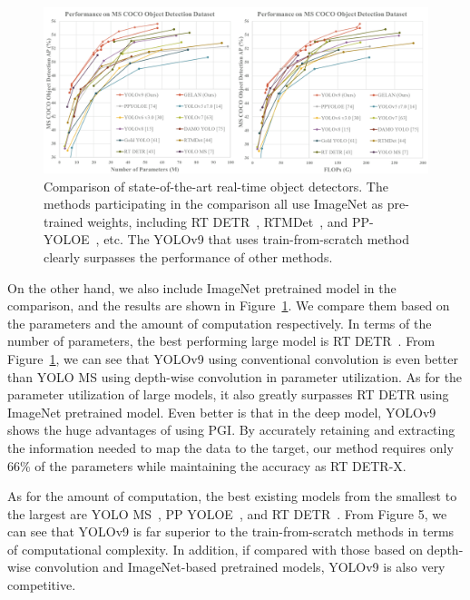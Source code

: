 \documentclass[10pt,twocolumn,letterpaper]{article}
\begin{document}
	\begin{figure}[t]
		\begin{center}
			\includegraphics[width=.85\linewidth]{figs/perf}
		\end{center}
		\vspace{-6pt}
		\caption{Comparison of state-of-the-art real-time object detectors. The methods participating in the comparison all use ImageNet as pre-trained weights, including RT DETR~\cite{lv2023detrs}, RTMDet~\cite{lyu2022rtmdet}, and PP-YOLOE~\cite{xu2022pp}, etc.  The YOLOv9 that uses train-from-scratch method clearly surpasses the performance of other methods.}	
		\vspace{-12pt}
		\label{fig:perf}
	\end{figure}
	
	On the other hand, we also include ImageNet pretrained model in the comparison, and the results are shown in Figure~\ref{fig:perf}.  We compare them based on the parameters and the amount of computation respectively.  In terms of the number of parameters, the best performing large model is RT DETR~\cite{lv2023detrs}.  From Figure~\ref{fig:perf}, we can see that YOLOv9 using conventional convolution is even better than YOLO MS using depth-wise convolution in parameter utilization.  As for the parameter utilization of large models, it also greatly surpasses RT DETR using ImageNet pretrained model.  Even better is that in the deep model, YOLOv9 shows the huge advantages of using PGI.  By accurately retaining and extracting the information needed to map the data to the target, our method requires only 66\% of the parameters while maintaining the accuracy as RT DETR-X.
	
	\newpage
	
	As for the amount of computation, the best existing models from the smallest to the largest are YOLO MS~\cite{chen2023yolo}, PP YOLOE~\cite{xu2022pp}, and RT DETR~\cite{lv2023detrs}.  From Figure 5, we can see that YOLOv9 is far superior to the train-from-scratch methods in terms of computational complexity.  In addition, if compared with those based on depth-wise convolution and ImageNet-based pretrained models, YOLOv9 is also very competitive.
	
\end{document}
